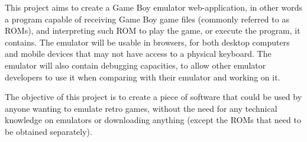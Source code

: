 This project aims to create a Game Boy emulator web-application, in other words a program capable of receiving Game Boy game files (commonly referred to as ROMs), and interpreting such ROM to play the game, or execute the program, it contains. The emulator will be usable in browsers, for both desktop computers and mobile devices that may not have access to a physical keyboard. The emulator will also contain debugging capacities, to allow other emulator developers to use it when comparing with their emulator and working on it.

The objective of this project is to create a piece of software that could be used by anyone wanting to emulate retro games, without the need for any technical knowledge on emulators or downloading anything (except the ROMs that need to be obtained separately).

